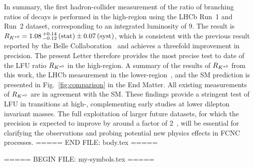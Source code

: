 In summary,  the first hadron-collider measurement of the ratio of branching ratios of 
decays is performed in the high-\qsq region using the LHCb Run~1 and Run~2 dataset, corresponding to an integrated luminosity of 9\invfb. The result is $R_{{{K}^{*0}}} = 1.08\,^{+0.14}_{-0.12}\text{\,(stat)} \pm 0.07\text{\,(syst)}$, which is consistent with the previous result reported by the Belle Collaboration~\cite{Belle:2019oag} and achieves a threefold improvement in
precision. The present Letter therefore provides the most precise test to date of the LFU ratio $R_{{{K}^{*0}}}$ in the high-\qsq region.
A summary of the results of $R_{{{K}^{*0}}}$ from this work, the LHCb measurement in the lower-\qsq region~\cite{LHCb-PAPER-2022-046}, and the SM prediction is presented in Fig.~\ref{fig:comparison} in the End Matter. All existing measurements of $R_{{{K}^{*0}}}$ are in agreement with
the SM.
These findings provide a stringent test of LFU in \bsll transitions at high-\qsq, complementing early studies at lower dilepton invariant masses.
The full exploitation of larger future datasets, for which the precision is expected to improve by around a factor of 2~\cite{LHCb-DP-2022-002}, will be essential for clarifying the observations and probing potential new physics effects in FCNC processes.
===== END FILE: body.tex =====

===== BEGIN FILE: my-symbols.tex =====
\def\runone{\textsc{Run\,1}\xspace}
\def\runtwo{\textsc{Run\,2}\xspace}
\def\runtwopo{\textsc{Run\,2p1}\xspace}
\def\runtwopt{\textsc{Run\,2p2}\xspace}
\def\millim   {\ensuremath{\mathrm{ \,mm}}\xspace}
\def\qtrack {\ensuremath{q^2_{\mathrm{track}}}\xspace}




\def\belleTwo{\mbox{Belle-II}\xspace}


\def\qsqmin{\ensuremath{q^2_{\mathrm{min}}}\xspace}
\def\qsqmax{\ensuremath{q^2_{\mathrm{max}}}\xspace}
\def\qtrack{\ensuremath{q^2_{\mathrm{track}}}\xspace}
\def\qbrem{\ensuremath{q^2_{\mathrm{brem}}}\xspace}

\def\BToDh{\mbox{\decay{\Bpm}{\Dz (\rightarrow \Kpm \pipm) \pipm}}\xspace}
\def\BmToDzK{\mbox{\decay{\Bm}{\Dz (\rightarrow \Kp \pim) K^{-}}\xspace}}
\def\ZToll{\mbox{\decay{\Z}{\ell^+\ell^-}}\xspace}
\def\ZToee{\mbox{\decay{\Z}{\ep\en}}\xspace}
\def\ZTomm{\mbox{\decay{\Z}{\mup\mun}}\xspace}
\def\ZTott{\mbox{\decay{\Z}{\taup \taum}}\xspace}
\def\JPsToee{\mbox{\decay{\jpsi}{\ep\en}}\xspace}
\def\JPsTomm{\mbox{\decay{\jpsi}{\mup\mun}}\xspace}
\def\WToe{\mbox{\decay{\Wm}{\en \neueb}}\xspace}
\def\WTom{\mbox{\decay{\Wm}{\mun \neumb}}\xspace}
\def\WTot{\mbox{\decay{\Wm}{\taum \neutb}}\xspace}
\def\WTol{\mbox{\decay{\Wm}{\ellm \neulb}}\xspace}
\def\KToe{\mbox{\decay{\Km}{\en \neueb}}\xspace}
\def\KTom{\mbox{\decay{\Km}{\mun \neumb}}\xspace}
\def\PiToe{\mbox{\decay{\pim}{\en \neueb}}\xspace}
\def\PiTom{\mbox{\decay{\pim}{\mun \neumb}}\xspace}



